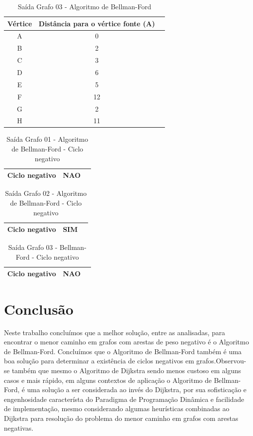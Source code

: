\documentclass[12pt]{article}
\begin{document}
\begin{table}[h!]
  \centering
  \caption{Saída Grafo 03 - Algoritmo de Bellman-Ford}
  \label{tab:table1}
  \begin{tabular}{ccc}
    \toprule
    Vértice & Distância para o vértice fonte (A)\\
    \midrule
    A & 0\\
    B & 2\\
    C & 3\\
    D & 6\\
    E & 5\\
     F & 12\\
      G & 2\\
       H & 11\\
    \bottomrule
  \end{tabular}
\end{table}

\begin{table}[h!]
  \centering
  \caption{Saída Grafo 01 - Algoritmo de Bellman-Ford - Ciclo negativo}
  \label{tab:table1}
  \begin{tabular}{ccc}
   \toprule
    Ciclo negativo & NAO\\
    \bottomrule
  \end{tabular}
\end{table}

\begin{table}[h!]
  \centering
  \caption{Saída Grafo 02 - Algoritmo de Bellman-Ford - Ciclo negativo}
  \label{tab:table1}
  \begin{tabular}{ccc}
    \toprule
    Ciclo negativo & SIM\\
    \bottomrule
  \end{tabular}
\end{table}

\begin{table}[h!]
  \centering
  \caption{Saída Grafo 03 - Bellman-Ford - Ciclo negativo}
  \label{tab:table1}
  \begin{tabular}{ccc}
    \toprule
    Ciclo negativo & NAO\\
    \bottomrule
  \end{tabular}
\end{table}

\section{Conclusão}
Neste trabalho concluímos que a melhor solução, entre as analisadas, para encontrar o menor caminho em grafos com arestas de peso negativo é o Algoritmo de Bellman-Ford. Concluímos que o Algoritmo de Bellman-Ford também é uma boa solução para determinar a existência de ciclos negativos em grafos.Observou-se também que mesmo o Algoritmo de Dijkstra sendo menos custoso em alguns casos e mais rápido, em alguns contextos de aplicação o Algoritmo de Bellman-Ford, é uma solução a ser considerada ao invés do Dijkstra, por sua  sofisticação e engenhosidade característa do Paradigma de Programação Dinâmica\cite{bellmandford} e facilidade de implementação, mesmo considerando algumas heurísticas combinadas ao Dijkstra para resolução do problema do menor caminho em grafos com arestas negativas.
\end{document}
